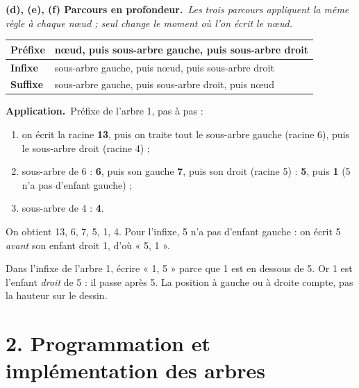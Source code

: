 \documentclass[11pt, a4paper]{exam}
\newcommand{\Qp}[2]{\par\medskip\noindent\textbf{#1}\ \textit{#2}\par\nopagebreak\smallskip}
\newcommand{\application}{\par\noindent\textbf{Application.}\ }
\begin{document}
\Qp{(d), (e), (f) Parcours en profondeur.}{Les trois parcours appliquent la même règle à chaque nœud ; seul change le moment où l'on écrit le nœud.}
\begin{center}
\renewcommand{\arraystretch}{1.25}
\begin{tabular}{|l|l|}
\hline
\textbf{Préfixe} & nœud, puis sous-arbre gauche, puis sous-arbre droit \\ \hline
\textbf{Infixe} & sous-arbre gauche, puis nœud, puis sous-arbre droit \\ \hline
\textbf{Suffixe} & sous-arbre gauche, puis sous-arbre droit, puis nœud \\ \hline
\end{tabular}
\end{center}
\application Préfixe de l'arbre 1, pas à pas :
\begin{enumerate}
\item on écrit la racine \textbf{13}, puis on traite tout le sous-arbre gauche (racine 6), puis le sous-arbre droit (racine 4) ;
\item sous-arbre de 6 : \textbf{6}, puis son gauche \textbf{7}, puis son droit (racine 5) : \textbf{5}, puis \textbf{1} (5 n'a pas d'enfant gauche) ;
\item sous-arbre de 4 : \textbf{4}.
\end{enumerate}
On obtient 13, 6, 7, 5, 1, 4. Pour l'infixe, 5 n'a pas d'enfant gauche : on écrit 5 \emph{avant} son enfant droit 1, d'où « 5, 1 ».
\begin{erreur}
Dans l'infixe de l'arbre 1, écrire « 1, 5 » parce que 1 est en dessous de 5. Or 1 est l'enfant \emph{droit} de 5 : il passe après 5. La position à gauche ou à droite compte, pas la hauteur sur le dessin.
\end{erreur}


\section*{2. Programmation et implémentation des arbres}
\end{document}
